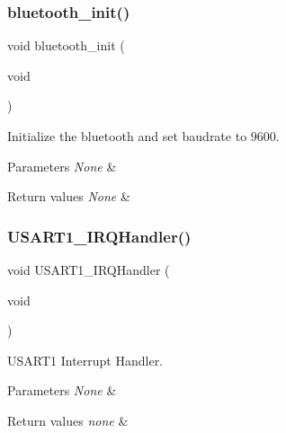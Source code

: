 \subsubsection{\texorpdfstring{bluetooth\+\_\+init()}{bluetooth\_init()}}
{\footnotesize\ttfamily void bluetooth\+\_\+init (\begin{DoxyParamCaption}\item[{void}]{ }\end{DoxyParamCaption})}



Initialize the bluetooth and set baudrate to 9600. 


\begin{DoxyParams}{Parameters}
{\em None} & \\
\hline
\end{DoxyParams}

\begin{DoxyRetVals}{Return values}
{\em None} & \\
\hline
\end{DoxyRetVals}
\mbox{\label{group___bluetooth___init_ga7139cd4baabbbcbab0c1fe6d7d4ae1cc}} 
\subsubsection{\texorpdfstring{U\+S\+A\+R\+T1\+\_\+\+I\+R\+Q\+Handler()}{USART1\_IRQHandler()}}
{\footnotesize\ttfamily void U\+S\+A\+R\+T1\+\_\+\+I\+R\+Q\+Handler (\begin{DoxyParamCaption}\item[{void}]{ }\end{DoxyParamCaption})}



U\+S\+A\+R\+T1 Interrupt Handler. 


\begin{DoxyParams}{Parameters}
{\em None} & \\
\hline
\end{DoxyParams}

\begin{DoxyRetVals}{Return values}
{\em none} & \\
\hline
\end{DoxyRetVals}

